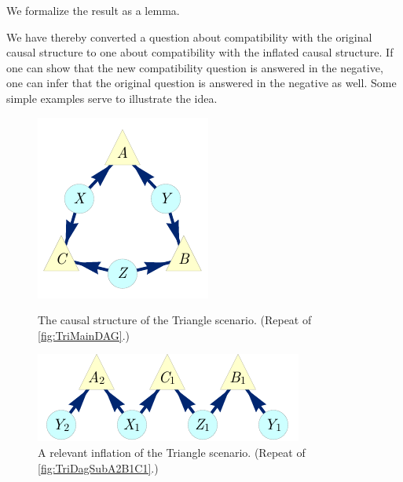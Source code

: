 We formalize the result as a lemma. 

We have thereby converted a question about compatibility with the original causal structure to one about compatibility with the inflated causal structure.  If one can show that the new compatibility question is answered in the negative, one can infer that the original question is answered in the negative as well.    Some simple examples serve to illustrate the idea.





\par\smallskip\nobreak
\begin{figure}[bh]
\centering
\begin{minipage}[t]{0.45\linewidth}
\centering
\includegraphics[scale=1]{TriDagRawALT.pdf}
\caption{The causal structure of the Triangle scenario. (Repeat of \cref{fig:TriMainDAG}.)}\label{fig:TriMainDAGv2}
\end{minipage}
\hfill
\begin{minipage}[t]{0.45\linewidth}
\centering
\includegraphics[scale=1]{TriDagSubA2B1C1.pdf}
\caption{A relevant inflation of the Triangle scenario. (Repeat of \cref{fig:TriDagSubA2B1C1}.)}\label{fig:TriDagSubA2B1C1v2}
\end{minipage}
\end{figure}


